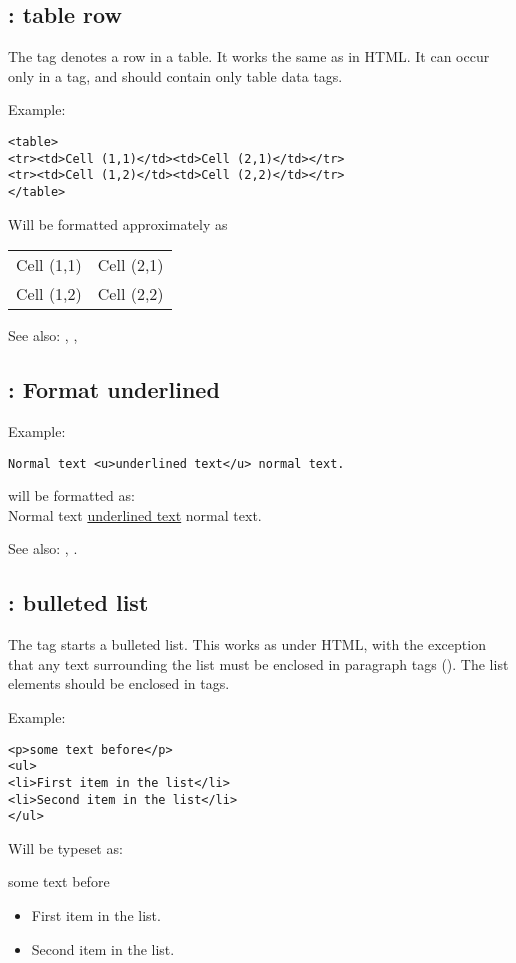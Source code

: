 \subsection{ : table row}
\label{tag:tr}
The  tag denotes a row in a table. It works the same as in HTML.
It can occur only in a  tag, and should contain only 
table data tags. 

Example:
\begin{verbatim}
<table>
<tr><td>Cell (1,1)</td><td>Cell (2,1)</td></tr>
<tr><td>Cell (1,2)</td><td>Cell (2,2)</td></tr>
</table>
\end{verbatim}
Will be formatted approximately as

\begin{tabular}{ll}
Cell (1,1) & Cell (2,1) \\
Cell (1,2) & Cell (2,2)
\end{tabular}

See also: , , 

\subsection{ : Format underlined}
\label{tag:u}

Example:
\begin{verbatim}
Normal text <u>underlined text</u> normal text.
\end{verbatim}
will be formatted as:\\
Normal text \underline{underlined text} normal text.

See also: , .

\subsection{ : bulleted list}
\label{tag:ul}
The  tag starts a bulleted list. This works as under HTML, with the
exception that any text surrounding the list must be enclosed in paragraph
tags (). The list elements should be enclosed in  tags.

Example:
\begin{verbatim}
<p>some text before</p>
<ul>
<li>First item in the list</li>
<li>Second item in the list</li>
</ul>
\end{verbatim}
Will be typeset as:

some text before
\begin{itemize}
\item First item in the list.
\item Second item in the list.
\end{itemize}

